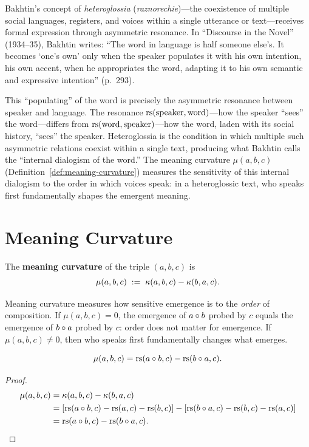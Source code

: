 \begin{interpretation}\label{interp:ch4:bakhtin_heteroglossia}
Bakhtin's concept of \emph{heteroglossia} (\emph{raznorechie})---the
coexistence of multiple social languages, registers, and voices within
a single utterance or text---receives formal expression through asymmetric
resonance. In ``Discourse in the Novel'' (1934--35), Bakhtin writes:
``The word in language is half someone else's. It becomes `one's own'
only when the speaker populates it with his own intention, his own
accent, when he appropriates the word, adapting it to his own semantic
and expressive intention'' (p.~293).

This ``populating'' of the word is precisely the asymmetric resonance
between speaker and language. The resonance $\mathrm{rs}(\text{speaker},
\text{word})$---how the speaker ``sees'' the word---differs from
$\mathrm{rs}(\text{word}, \text{speaker})$---how the word, laden with its social
history, ``sees'' the speaker. Heteroglossia is the condition in which
multiple such asymmetric relations coexist within a single text,
producing what Bakhtin calls the ``internal dialogism of the word.''
The meaning curvature $\mu(a, b, c)$
(Definition~\ref{def:meaning-curvature}) measures the sensitivity of this
internal dialogism to the order in which voices speak: in a heteroglossic
text, who speaks first fundamentally shapes the emergent meaning.
\end{interpretation}

\section{Meaning Curvature}

\begin{definition}\label{def:meaning-curvature}
The \textbf{meaning curvature} of the triple $(a, b, c)$ is
\[
    \mu(a, b, c) \;:=\; \kappa(a, b, c) - \kappa(b, a, c).
\]
\end{definition}

Meaning curvature measures how sensitive emergence is to the \emph{order}
of composition. If $\mu(a,b,c) = 0$, the emergence of $a \circ b$
probed by $c$ equals the emergence of $b \circ a$ probed by $c$:
order does not matter for emergence. If $\mu(a,b,c) \neq 0$, then
who speaks first fundamentally changes what emerges.

\begin{proposition}
\[
    \mu(a, b, c) = \mathrm{rs}(a \circ b, c) - \mathrm{rs}(b \circ a, c).
\]
\end{proposition}
\begin{proof}
\begin{align*}
    \mu(a,b,c) &= \kappa(a,b,c) - \kappa(b,a,c) \\
    &= [\mathrm{rs}(a \circ b, c) - \mathrm{rs}(a,c) - \mathrm{rs}(b,c)]
     - [\mathrm{rs}(b \circ a, c) - \mathrm{rs}(b,c) - \mathrm{rs}(a,c)] \\
    &= \mathrm{rs}(a \circ b, c) - \mathrm{rs}(b \circ a, c).
\end{align*}
\end{proof}

